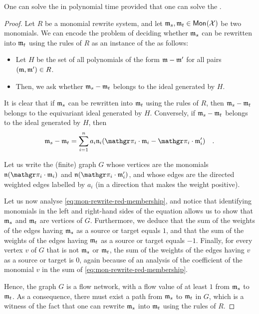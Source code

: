 \begin{lemma}
  \label{lem:mon-rewrite-red-membership}
  One can solve the  in polynomial time
  provided that one can solve the .
\end{lemma}
\begin{proof}
  Let $R$ be a monomial rewrite system, and let $\monelt_s, \monelt_t \in
  \mon{\Indets}$ be two monomials. We can encode the problem of deciding whether
  $\monelt_s$ can be rewritten into $\monelt_t$ using the rules of $R$ as an
  instance of the  as follows:
  \begin{itemize}
    \item Let $H$ be the set of all polynomials of the form $\monelt - \monelt'$
      for all pairs
      $(\monelt, \monelt') \in R$.
    \item Then, we ask whether $\monelt_s - \monelt_t$ belongs to the ideal generated by $H$.
  \end{itemize}

  It is clear that if $\monelt_s$ can be rewritten into $\monelt_t$ using the
  rules of $R$, then $\monelt_s - \monelt_t$ belongs to the equivariant ideal generated by
  $H$. Conversely, if $\monelt_s - \monelt_t$ belongs to the ideal generated by
  $H$, then 
  \begin{equation}
    \label{eq:mon-rewrite-red-membership}
    \monelt_s - \monelt_t 
    = 
    \sum_{i=1}^n a_i \monelt[n]_i (\gelem_i \cdot \monelt_i - \gelem_i \cdot \monelt'_i)
    \quad .
  \end{equation}

  Let us write the (finite) graph $G$ whose vertices are the monomials
  $\monelt[n] (\gelem_i \cdot \monelt_i)$ and $\monelt[n] (\gelem_i \cdot
  \monelt'_i)$, and whose edges are the directed weighted edges labelled by
  $a_i$ (in a direction that makes the weight positive).

  Let us now analyse \cref{eq:mon-rewrite-red-membership}, and notice that
  identifying monomials in the left and right-hand sides of the equation allows
  us to show that $\monelt_s$ and $\monelt_t$ are vertices of $G$. Furthermore,
  we deduce that the sum of the weights of the edges having $\monelt_s$ as a
  source or target equals $1$, and that the sum of the weights of the edges
  having $\monelt_t$ as a source or target equals $-1$. Finally, for every
  vertex $v$ of $G$ that is not $\monelt_s$ or $\monelt_t$, the sum of the
  weights of the edges having $v$ as a source or target is $0$, again because
  of an analysis of the coefficient of the monomial $v$ in the sum of
  \cref{eq:mon-rewrite-red-membership}.

  Hence, the graph $G$ is a flow network, with a flow value of at least $1$
  from $\monelt_s$ to $\monelt_t$. As a consequence, there must exist a path
  from $\monelt_s$ to $\monelt_t$ in $G$, which is a witness
  of the fact that 
  one can rewrite $\monelt_s$ into $\monelt_t$ using the rules of $R$.
\end{proof}

